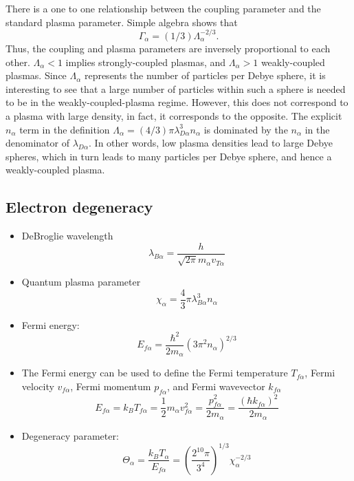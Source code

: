 \documentclass[a4paper,11pt]{report}
\begin{document}
There is a one to one relationship between the coupling parameter and the standard plasma parameter. Simple algebra shows that 
\begin{equation}
    \Gamma_\alpha = (1/3) \Lambda_\alpha^{-2/3}.
\end{equation}
Thus, the coupling and plasma parameters are inversely proportional to each other. $\Lambda_\alpha < 1$ implies strongly-coupled plasmas, and $\Lambda_\alpha > 1$ weakly-coupled plasmas. Since $\Lambda_\alpha$ represents the number of particles per Debye sphere, it is interesting to see that a large number of particles within such a sphere is needed to be in the weakly-coupled-plasma regime. However, this does not correspond to a plasma with large density, in fact, it corresponds to the opposite. The explicit $n_\alpha$ term in the definition $\Lambda_\alpha = (4/3) \pi \lambda^3_{D\alpha} n_\alpha$ is dominated by the $n_\alpha$ in the denominator of $\lambda_{D\alpha}$. In other words, low plasma densities lead to large Debye spheres, which in turn leads to many particles per Debye sphere, and hence a weakly-coupled plasma.

\subsection{Electron degeneracy}

\begin{itemize}
    \item DeBroglie wavelength
    \begin{equation}
        \lambda_{B\alpha} = \dfrac{h}{\sqrt{2 \pi} m_\alpha v_{T\alpha}}
    \end{equation}
    \item Quantum plasma parameter
    \begin{equation}
        \chi_\alpha = \frac{4}{3} \pi \lambda_{B\alpha}^3 n_\alpha
    \end{equation}
    
    \item Fermi energy:
    \begin{equation}
        E_{f\alpha} = \frac{\hbar^2}{2m_\alpha} \left ( 3 \pi^2 n_\alpha \right)^{2/3}
    \end{equation}

    \item The Fermi energy can be used to define the Fermi temperature $T_{f\alpha}$, Fermi velocity $v_{f\alpha}$, Fermi momentum $p_{f\alpha}$, and Fermi wavevector $k_{f\alpha}$
    \begin{equation}
        E_{f\alpha} = k_B T_{f\alpha} = \frac{1}{2} m_\alpha v_{f\alpha}^2  = \frac{p_{f\alpha}^2}{2m_\alpha} = \frac{\left ( \hbar k_{f\alpha} \right ) ^2}{2m_\alpha}
    \end{equation}

    \item Degeneracy parameter:
    \begin{equation}
        \Theta_\alpha = \frac{k_B T_\alpha}{E_{f\alpha}} = \left( \frac{2^{10} \pi}{3^4} \right)^{1/3} \chi_\alpha^{-2/3}
    \end{equation}
\end{itemize}
\end{document}
